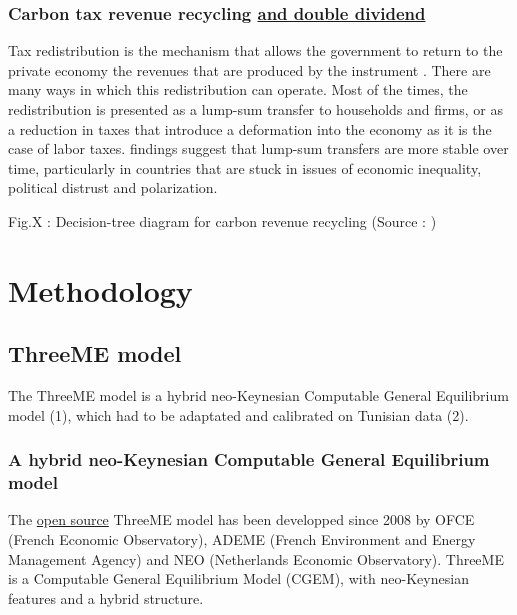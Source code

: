 \documentclass[
]{article}
\begin{document}
\hypertarget{carbon-tax-revenue-recycling-and-double-dividend}{%
\subsubsection{\texorpdfstring{Carbon tax revenue recycling
\underline{and double
dividend}}{Carbon tax revenue recycling and double dividend}}\label{carbon-tax-revenue-recycling-and-double-dividend}}

Tax redistribution is the mechanism that allows the government to return
to the private economy the revenues that are produced by the instrument
\autocite{goulder}. There are many ways in which this redistribution can
operate. Most of the times, the redistribution is presented as a
lump-sum transfer to households and firms, or as a reduction in taxes
that introduce a deformation into the economy as it is the case of labor
taxes. \textcite{klenert2018} findings suggest that lump-sum transfers
are more stable over time, particularly in countries that are stuck in
issues of economic inequality, political distrust and polarization.

Fig.X : Decision-tree diagram for carbon revenue recycling (Source :
\textcite{klenert2018} )

\hypertarget{methodology}{%
\section{Methodology}\label{methodology}}

\hypertarget{threeme-model}{%
\subsection{ThreeME model}\label{threeme-model}}

The ThreeME model is a hybrid neo-Keynesian Computable General
Equilibrium model (1), which had to be adaptated and calibrated on
Tunisian data (2).

\hypertarget{a-hybrid-neo-keynesian-computable-general-equilibrium-model}{%
\subsubsection{A hybrid neo-Keynesian Computable General Equilibrium
model}\label{a-hybrid-neo-keynesian-computable-general-equilibrium-model}}

The \href{https://github.com/fosem/ThreeME_V3-open}{open source} ThreeME
model has been developped since 2008 by OFCE (French Economic
Observatory), ADEME (French Environment and Energy Management Agency)
and NEO (Netherlands Economic Observatory). ThreeME is a Computable
General Equilibrium Model (CGEM), with neo-Keynesian features and a
hybrid structure.
\end{document}
